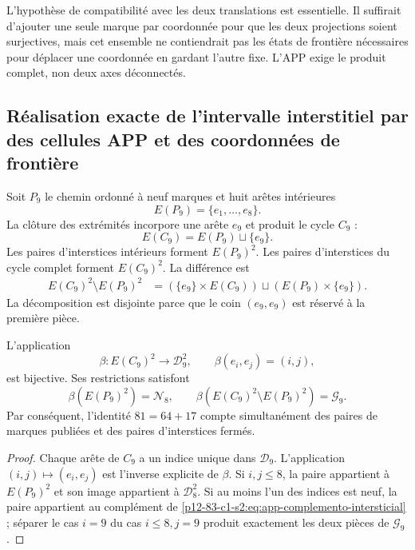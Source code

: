 L’hypothèse de compatibilité avec les deux translations est essentielle. Il suffirait
d’ajouter une seule marque par coordonnée pour que les deux projections soient
surjectives, mais cet ensemble ne contiendrait pas les états de frontière
nécessaires pour déplacer une coordonnée en gardant l’autre fixe. L’APP exige le
produit complet, non deux axes déconnectés.

\subsection{Réalisation exacte de l’intervalle interstitiel par des cellules APP et des coordonnées de frontière}

Soit \(P_9\) le chemin ordonné à neuf marques et huit arêtes intérieures
\[
 E(P_9)=\{e_1,\ldots,e_8\}.
\]
La clôture des extrémités incorpore une arête \(e_9\) et produit le cycle
\(C_9\) :
\[
 E(C_9)=E(P_9)\sqcup\{e_9\}.
\]
Les paires d’interstices intérieurs forment \(E(P_9)^2\). Les paires
d’interstices du cycle complet forment \(E(C_9)^2\). La différence est
\begin{align}
 E(C_9)^2\setminus E(P_9)^2
   &=(\{e_9\}\times E(C_9))
     \sqcup(E(P_9)\times\{e_9\}).
\label{p12-83-c1-s2:eq:app-complemento-intersticial}
\end{align}
La décomposition est disjointe parce que le coin \((e_9,e_9)\) est réservé à
la première pièce.

\begin{theorem}
\label{p12-83-c1-s2:thm:app-equivalencia-modelos}
L'application
\[
 \beta:E(C_9)^2\longrightarrow\mathcal D_9^2,
 \qquad
 \beta(e_i,e_j)=(i,j),
\]
est bijective. Ses restrictions satisfont
\[
 \beta(E(P_9)^2)=\mathcal N_8,
 \qquad
 \beta(E(C_9)^2\setminus E(P_9)^2)=\mathcal G_9.
\]
Par conséquent, l’identité \(81=64+17\) compte simultanément des paires de
marques publiées et des paires d’interstices fermés.
\end{theorem}

\begin{proof}
Chaque arête de \(C_9\) a un indice unique dans \(\mathcal D_9\).
L’application \((i,j)\mapsto(e_i,e_j)\) est l’inverse explicite de \(\beta\).
Si \(i,j\leq8\), la paire appartient à \(E(P_9)^2\) et son image appartient à
\(\mathcal D_8^2\). Si au moins l’un des indices est neuf, la paire appartient
au complément de \cref{p12-83-c1-s2:eq:app-complemento-intersticial} ; séparer le cas
\(i=9\) du cas \(i\leq8,j=9\) produit exactement les deux pièces de
\(\mathcal G_9\).
\end{proof}

